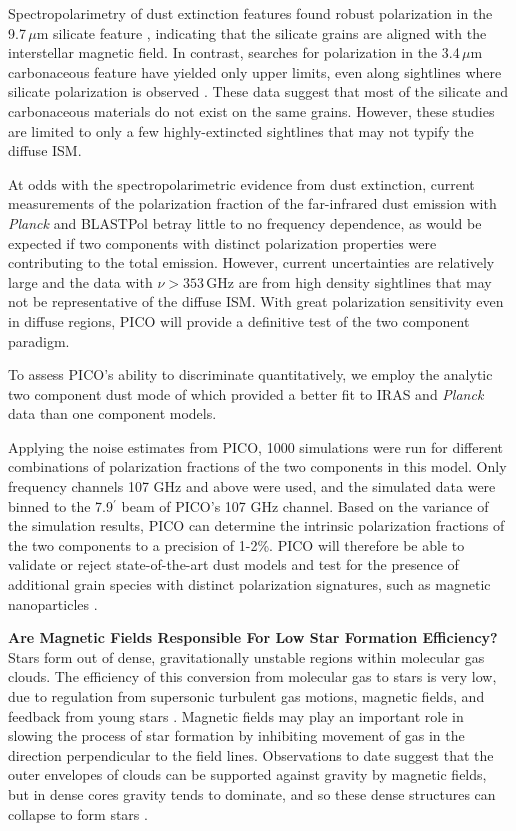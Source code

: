 \documentclass[PICOReport.tex]{subfiles}
\begin{document}
Spectropolarimetry of dust extinction features found robust polarization in the 9.7\,$\mu$m silicate feature \citep[e.g.,][]{Smith2000}, indicating that the silicate grains are aligned with the interstellar magnetic field. In contrast, searches for polarization in the 3.4\,$\mu$m carbonaceous feature have yielded only upper limits, even along sightlines where silicate polarization is observed \citep{Chiar2006,Mason2007}. These data suggest that most of the silicate and carbonaceous materials do not exist on the same grains. However, these studies are limited to only a few highly-extincted sightlines that may not typify the diffuse ISM.

At odds with the spectropolarimetric evidence from dust extinction, current measurements of the polarization fraction of the far-infrared dust emission with {\it Planck} \citep{Planck_Int_XXII} and BLASTPol \citep{Ashton2018} betray little to no frequency dependence, as would be expected if two components with distinct polarization properties were contributing to the total emission. However, current uncertainties are relatively large and the data with $\nu > 353\,$GHz are from high density sightlines that may not be representative of the diffuse ISM. With great polarization sensitivity even in diffuse regions, PICO will provide a definitive test of the two component paradigm.

To assess PICO's ability to discriminate quantitatively, we employ the analytic two component dust mode of \cite{Meisner2015} which provided a better fit to IRAS and {\it Planck} data than one component models. 

Applying the noise estimates from PICO, 1000 simulations were run for different combinations of polarization fractions of the two components in this model. Only frequency channels 107 GHz and above were used, and the simulated data were binned to the 7.9$^\prime$ beam of PICO's 107 GHz channel. Based on the variance of the simulation results, PICO can determine the intrinsic polarization fractions of the two components to a precision of 1-2\%. PICO will therefore be able to validate or reject state-of-the-art dust models \citep[e.g.][Hensley \& Draine, in prep]{Guillet2018} and test for the presence of additional grain species with distinct polarization signatures, such as magnetic nanoparticles \citep{Draine2013}.


{\bf Are Magnetic Fields Responsible For Low Star Formation Efficiency?}\\
Stars form out of dense, gravitationally unstable regions within molecular gas clouds. The efficiency of this conversion from molecular gas to stars is very low, due to regulation from supersonic turbulent gas motions, magnetic fields, and feedback from young stars \citep{McKee2007}. 
Magnetic fields may play an important role in slowing the process of star formation by inhibiting movement of gas in the direction perpendicular to the field lines.  Observations to date suggest that the outer envelopes of clouds can be supported against gravity by magnetic fields, but in dense cores gravity tends to dominate, and so these dense structures can collapse to form stars \citep{Crutcher2010}.
\end{document}
